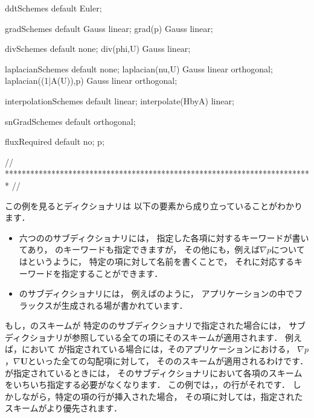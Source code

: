 \begin{OFverbatim}[file, linenum=17]

ddtSchemes
{
    default         Euler;
}

gradSchemes
{
    default         Gauss linear;
    grad(p)         Gauss linear;
}

divSchemes
{
    default         none;
    div(phi,U)      Gauss linear;
}

laplacianSchemes
{
    default         none;
    laplacian(nu,U) Gauss linear orthogonal;
    laplacian((1|A(U)),p) Gauss linear orthogonal;
}

interpolationSchemes
{
    default         linear;
    interpolate(HbyA) linear;
}

snGradSchemes
{
    default         orthogonal;
}

fluxRequired
{
    default         no;
    p;
}


// ************************************************************************* //
\end{OFverbatim}
この例を見るとディクショナリは
以下の要素から成り立っていることがわかります．
\begin{itemize}
 \item 六つののサブディクショナリには，
       指定した各項に対するキーワードが書いてあり，
       のキーワードも指定できますが，
       その他にも，例えば$\nabla p$についてはというように，
       特定の項に対して名前を書くことで，
       それに対応するキーワードを指定することができます．
 \item {}のサブディクショナリには，
       例えばのように，
       アプリケーションの中でフラックスが生成される場が書かれています．
\end{itemize}
もし，のスキームが
特定ののサブディクショナリで指定された場合には，
サブディクショナリが参照している全ての項にそのスキームが適用されます．
例えば，において
が指定されている場合には，そのアプリケーションにおける，
$\nabla p$，$\nabla\bm{U}$といった全ての勾配項に対して，
そののスキームが適用されるわけです．
が指定されているときには，
そのサブディクショナリにおいて各項のスキームをいちいち指定する必要がなくなります．
この例では，，の行がそれです．
しかしながら，特定の項の行が挿入された場合，
その項に対しては，指定されたスキームがより優先されます．

